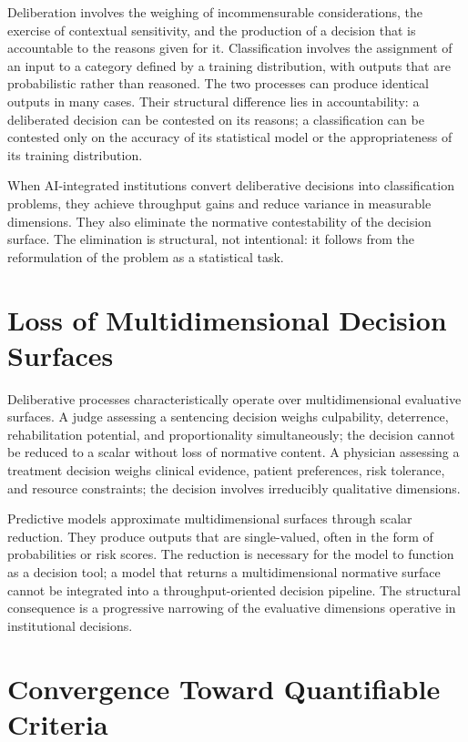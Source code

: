 \documentclass[12pt, oneside]{book}
\theoremstyle{plain}
\theoremstyle{definition}
\theoremstyle{remark}
\theoremstyle{definition}
\begin{document}
Deliberation involves the weighing of incommensurable considerations, the exercise
of contextual sensitivity, and the production of a decision that is accountable to
the reasons given for it. Classification involves the assignment of an input to a
category defined by a training distribution, with outputs that are probabilistic
rather than reasoned. The two processes can produce identical outputs in many cases.
Their structural difference lies in accountability: a deliberated decision can be
contested on its reasons; a classification can be contested only on the accuracy
of its statistical model or the appropriateness of its training distribution.

When AI-integrated institutions convert deliberative decisions into classification
problems, they achieve throughput gains and reduce variance in measurable dimensions.
They also eliminate the normative contestability of the decision surface. The
elimination is structural, not intentional: it follows from the reformulation of the
problem as a statistical task.

\section{Loss of Multidimensional Decision Surfaces}

Deliberative processes characteristically operate over multidimensional evaluative
surfaces. A judge assessing a sentencing decision weighs culpability, deterrence,
rehabilitation potential, and proportionality simultaneously; the decision cannot be
reduced to a scalar without loss of normative content. A physician assessing a
treatment decision weighs clinical evidence, patient preferences, risk tolerance, and
resource constraints; the decision involves irreducibly qualitative dimensions.

Predictive models approximate multidimensional surfaces through scalar reduction.
They produce outputs that are single-valued, often in the form of probabilities or
risk scores. The reduction is necessary for the model to function as a decision tool;
a model that returns a multidimensional normative surface cannot be integrated into
a throughput-oriented decision pipeline. The structural consequence is a progressive
narrowing of the evaluative dimensions operative in institutional decisions.

\section{Convergence Toward Quantifiable Criteria}
\end{document}
